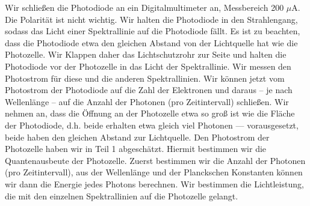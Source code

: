 \documentclass[12px]{scrartcl}
\begin{document}
Wir schließen die Photodiode an ein Digitalmultimeter an, Messbereich 200 $\mu$A. Die Polarität ist nicht wichtig. Wir halten die Photodiode in den Strahlengang, sodass das Licht einer Spektrallinie auf die Photodiode fällt. Es ist zu beachten, dass die Photodiode etwa den gleichen Abstand von der Lichtquelle hat wie die Photozelle.
Wir Klappen daher das Lichtschutzrohr zur Seite
und halten die Photodiode vor der Photozelle in das Licht der Spektrallinie.
Wir messen den Photostrom für diese und die anderen Spektrallinien.
Wir können jetzt vom Photostrom der Photodiode auf die Zahl der Elektronen und daraus -- je nach Wellenlänge -- auf die Anzahl der Photonen (pro Zeitintervall) schließen. Wir nehmen an, dass die Öffnung an der Photozelle etwa so groß ist wie die Fläche der Photodiode, d.h. beide erhalten etwa gleich viel Photonen — vorausgesetzt, beide haben den gleichen Abstand zur Lichtquelle. Den Photostrom der Photozelle haben wir in Teil 1 abgeschätzt. Hiermit bestimmen wir die Quantenausbeute der Photozelle. Zuerst bestimmen wir die Anzahl der Photonen (pro Zeitintervall), aus der Wellenlänge und der Planckschen Konstanten können wir dann die Energie jedes Photons berechnen. Wir bestimmen die Lichtleistung, die mit den einzelnen Spektrallinien auf die Photozelle gelangt.
\end{document}

